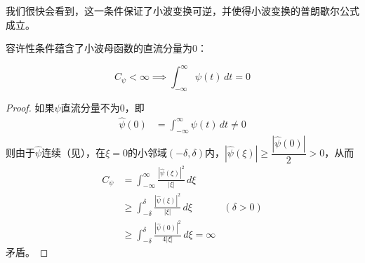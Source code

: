 我们很快会看到，这一条件保证了小波变换可逆，并使得小波变换的普朗歇尔公式成立。

容许性条件蕴含了小波母函数的直流分量为0：

\begin{proposition}
    \[ C_{\psi}<\infty\implies\int_{-\infty}^{\infty}\psi(t)\,dt=0\]
\end{proposition}
\begin{proof}
    如果$\psi$直流分量不为0，即
    \begin{align*}
    \hat{\psi}(0)&=\int_{-\infty}^{\infty}\psi(t)\,dt\neq 0
    \end{align*}
    则由于$\hat{\psi}$连续（见），在$\xi=0$的小邻域$(-\delta,\delta)$内，$|\hat{\psi}(\xi)|\geq \dfrac{|\hat{\psi}(0)|}{2}>0$，从而
    \begin{align*}
        C_{\psi}&=\int_{-\infty}^{\infty}\frac{|\hat{\psi}(\xi)|^2}{|\xi|}\,d\xi\\
        &\geq \int_{-\delta}^{\delta}\frac{|\hat{\psi}(\xi)|^2}{|\xi|}\,d\xi&(\delta>0)\\
        &\geq \int_{-\delta}^{\delta}\frac{|\hat{\psi}(0)|^2}{4|\xi|}\,d\xi=\infty
    \end{align*}
    矛盾。
\end{proof}

